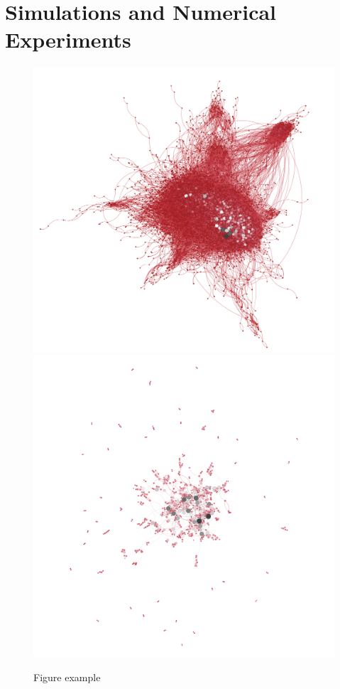 \section{Simulations and Numerical Experiments}
\begin{figure}[ht]
    \centering
    \includegraphics[width=0.4\linewidth]{figures/tw.png}
    \includegraphics[width=0.4\linewidth]{figures/SMS_network.png}
    \caption{Figure example}
    \label{fig:enter-label}
\end{figure}
\lipsum[9-12]